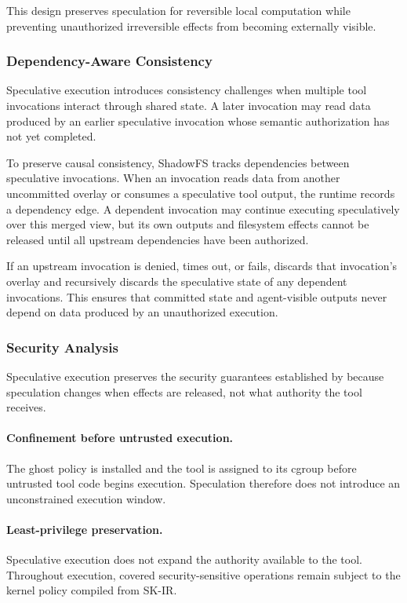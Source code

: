 This design preserves speculation for reversible local computation while
preventing unauthorized irreversible effects from becoming externally visible.

\subsubsection{Dependency-Aware Consistency}
\label{sec:design:speculative:dependency}

Speculative execution introduces consistency challenges when multiple tool
invocations interact through shared state. A later invocation may read data
produced by an earlier speculative invocation whose semantic authorization has
not yet completed.

To preserve causal consistency, ShadowFS tracks dependencies between
speculative invocations. When an invocation reads data from another uncommitted
overlay or consumes a speculative tool output, the runtime records a dependency
edge. A dependent invocation may continue executing speculatively over this
merged view, but its own outputs and filesystem effects cannot be released
until all upstream dependencies have been authorized.

If an upstream invocation is denied, times out, or fails, \SystemName discards
that invocation's overlay and recursively discards the speculative state of any
dependent invocations. This ensures that committed state and agent-visible
outputs never depend on data produced by an unauthorized execution.

\subsubsection{Security Analysis}
\label{sec:design:speculative:safety}

Speculative execution preserves the security guarantees established by
\SystemName because speculation changes when effects are released, not what
authority the tool receives.

\paragraph{Confinement before untrusted execution.}
The ghost policy is installed and the tool is assigned to its cgroup before
untrusted tool code begins execution. Speculation therefore does not introduce
an unconstrained execution window.

\paragraph{Least-privilege preservation.}
Speculative execution does not expand the authority available to the tool.
Throughout execution, covered security-sensitive operations remain subject to
the kernel policy compiled from SK-IR.

